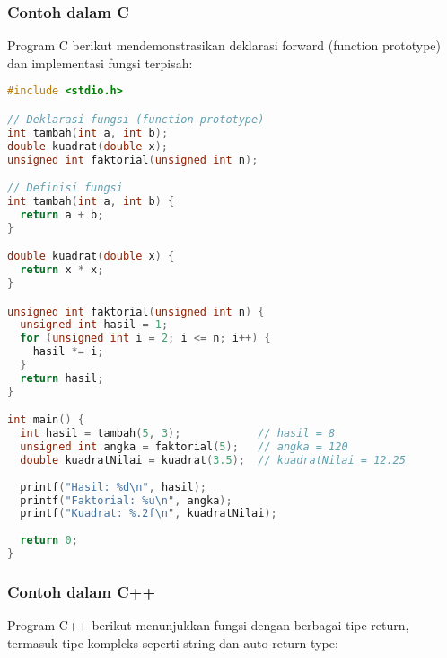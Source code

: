 \documentclass[../main.tex]{subfiles}
\begin{document}
\subsubsection{Contoh dalam C}

Program C berikut mendemonstrasikan deklarasi forward (function prototype) dan implementasi fungsi terpisah:

\begin{lstlisting}[language=C, caption={Deklarasi dan definisi fungsi (C)}]
#include <stdio.h>

// Deklarasi fungsi (function prototype)
int tambah(int a, int b);
double kuadrat(double x);
unsigned int faktorial(unsigned int n);

// Definisi fungsi
int tambah(int a, int b) {
  return a + b;
}

double kuadrat(double x) {
  return x * x;
}

unsigned int faktorial(unsigned int n) {
  unsigned int hasil = 1;
  for (unsigned int i = 2; i <= n; i++) {
    hasil *= i;
  }
  return hasil;
}

int main() {
  int hasil = tambah(5, 3);            // hasil = 8
  unsigned int angka = faktorial(5);   // angka = 120
  double kuadratNilai = kuadrat(3.5);  // kuadratNilai = 12.25
  
  printf("Hasil: %d\n", hasil);
  printf("Faktorial: %u\n", angka);
  printf("Kuadrat: %.2f\n", kuadratNilai);
  
  return 0;
}
\end{lstlisting}

\subsubsection{Contoh dalam C++}

Program C++ berikut menunjukkan fungsi dengan berbagai tipe return, termasuk tipe kompleks seperti string dan auto return type:
\end{document}
